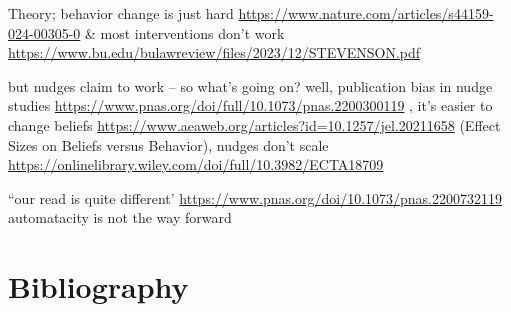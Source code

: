 \documentclass[sn-nature,pdflatex]{sn-jnl}
\begin{document}
Theory; behavior change is just hard
\url{https://www.nature.com/articles/s44159-024-00305-0} \& most
interventions don't work
\url{https://www.bu.edu/bulawreview/files/2023/12/STEVENSON.pdf}

but nudges claim to work -- so what's going on? well, publication bias
in nudge studies
\url{https://www.pnas.org/doi/full/10.1073/pnas.2200300119} , it's
easier to change beliefs
\url{https://www.aeaweb.org/articles?id=10.1257/jel.20211658} (Effect
Sizes on Beliefs versus Behavior), nudges don't scale
\url{https://onlinelibrary.wiley.com/doi/full/10.3982/ECTA18709}

``our read is quite different'
\url{https://www.pnas.org/doi/10.1073/pnas.2200732119} automatacity is
not the way forward

\section{Bibliography}\label{bibliography}

\renewcommand\refname{References}

\end{document}
